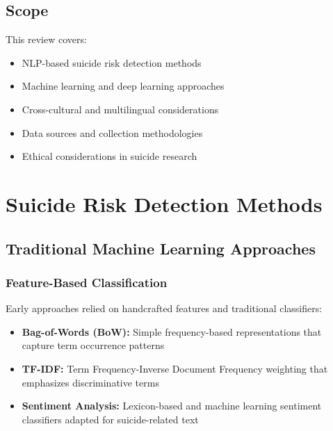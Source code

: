 \documentclass[12pt,a4paper]{article}
\begin{document}
\subsection{Scope}
This review covers:
\begin{itemize}
    \item NLP-based suicide risk detection methods
    \item Machine learning and deep learning approaches
    \item Cross-cultural and multilingual considerations
    \item Data sources and collection methodologies
    \item Ethical considerations in suicide research
\end{itemize}

\section{Suicide Risk Detection Methods}

\subsection{Traditional Machine Learning Approaches}

\subsubsection{Feature-Based Classification}
Early approaches relied on handcrafted features and traditional classifiers:

\begin{itemize}
    \item \textbf{Bag-of-Words (BoW):} Simple frequency-based representations that capture term occurrence patterns \cite{cai2018}
    \item \textbf{TF-IDF:} Term Frequency-Inverse Document Frequency weighting that emphasizes discriminative terms \cite{yadav2020}
    \item \textbf{Sentiment Analysis:} Lexicon-based and machine learning sentiment classifiers adapted for suicide-related text \cite{lang2020}
\end{itemize}
\end{document}
